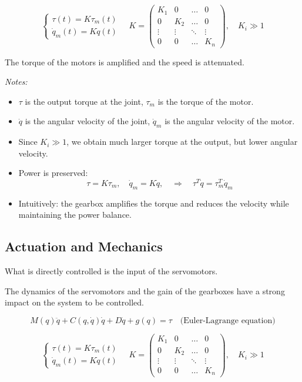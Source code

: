 \[
\begin{cases}
\tau(t) = K \tau_m(t) \\
\dot{q}_m(t) = K \dot{q}(t)
\end{cases}
\quad
K = 
\begin{pmatrix}
K_1 & 0   & \dots & 0 \\
0   & K_2 & \dots & 0 \\
\vdots & \vdots & \ddots & \vdots \\
0   & 0   & \dots & K_n
\end{pmatrix}, 
\quad K_i \gg 1
\]

The torque of the motors is amplified and the speed is attenuated.  

\textit{Notes:}  
\begin{itemize}
    \item $\tau$ is the output torque at the joint, $\tau_m$ is the torque of the motor.  
    \item $\dot{q}$ is the angular velocity of the joint, $\dot{q}_m$ is the angular velocity of the motor.  
    \item Since $K_i \gg 1$, we obtain much larger torque at the output, but lower angular velocity.  
    \item Power is preserved:  
    \[
    \tau = K \tau_m, \quad \dot{q}_m = K \dot{q}, \quad \Rightarrow \quad \tau^T \dot{q} = \tau_m^T \dot{q}_m
    \]  
    \item Intuitively: the gearbox amplifies the torque and reduces the velocity while maintaining the power balance.  
\end{itemize}

\hfill

\subsection{Actuation and Mechanics}

What is directly controlled is the input of the servomotors.  

The dynamics of the servomotors and the gain of the gearboxes have a strong impact on the system to be controlled.  

\[
M(q)\ddot{q} + C(q,\dot{q})\dot{q} + D\dot{q} + g(q) = \tau
\quad \text{(Euler-Lagrange equation)}
\]

\[
\begin{cases}
\tau(t) = K \tau_m(t) \\
\dot{q}_m(t) = K \dot{q}(t)
\end{cases}
\quad
K = 
\begin{pmatrix}
K_1 & 0   & \dots & 0 \\
0   & K_2 & \dots & 0 \\
\vdots & \vdots & \ddots & \vdots \\
0   & 0   & \dots & K_n
\end{pmatrix}, 
\quad K_i \gg 1
\]

